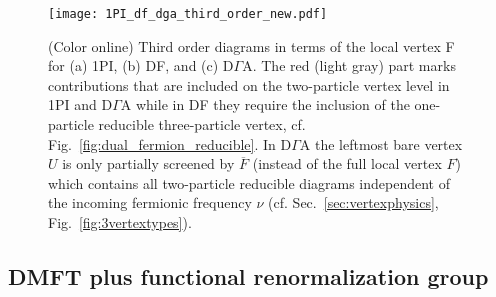 \documentclass[rmp,aps,reprint,amsmath,amssymb,superscriptaddress,showpacs,nofootinbib]{revtex4-1}
\begin{document}
\begin{figure}
  \centering
  \texttt{[image: 1PI\_df\_dga\_third\_order\_new.pdf]}
    \caption{(Color online)  Third order diagrams in terms of the local vertex F for (a) 1PI, (b) DF, and (c) D$\Gamma$A. The red (light gray) part marks contributions that are included on the two-particle vertex level in 1PI and D$\Gamma$A while in DF they require the inclusion of the one-particle reducible three-particle vertex, cf. Fig.~\ref{fig:dual_fermion_reducible}. In D$\Gamma$A the leftmost bare vertex $U$ is only partially screened by $\overline{F}$ (instead of the full local vertex $F$) which contains all two-particle reducible diagrams independent of the incoming fermionic frequency $\nu$ (cf. Sec.~\ref{sec:vertexphysics}, Fig.~\ref{fig:3vertextypes}).}
  \label{fig:compmethods}
\end{figure}

\subsection{DMFT plus functional renormalization group}
\label{subsec:DMFT2fRG}
\end{document}
